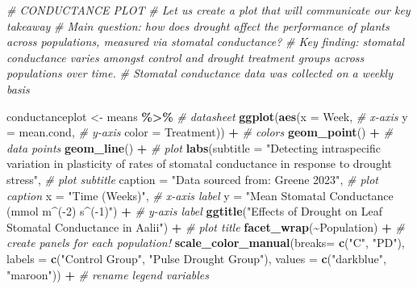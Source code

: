 \documentclass[
]{article}
\newenvironment{Shaded}{\begin{snugshade}}{\end{snugshade}}
\newcommand{\AttributeTok}[1]{\textcolor[rgb]{0.13,0.29,0.53}{#1}}
\newcommand{\CommentTok}[1]{\textcolor[rgb]{0.56,0.35,0.01}{\textit{#1}}}
\newcommand{\FunctionTok}[1]{\textcolor[rgb]{0.13,0.29,0.53}{\textbf{#1}}}
\newcommand{\NormalTok}[1]{#1}
\newcommand{\OtherTok}[1]{\textcolor[rgb]{0.56,0.35,0.01}{#1}}
\newcommand{\SpecialCharTok}[1]{\textcolor[rgb]{0.81,0.36,0.00}{\textbf{#1}}}
\newcommand{\StringTok}[1]{\textcolor[rgb]{0.31,0.60,0.02}{#1}}
\begin{document}
\begin{Shaded}
\begin{Highlighting}[]
\CommentTok{\# CONDUCTANCE PLOT}
\CommentTok{\# Let us create a plot that will communicate our key takeaway}
\CommentTok{\# Main question: how does drought affect the performance of plants across populations, measured via stomatal conductance?}
\CommentTok{\# Key finding: stomatal conductance varies amongst control and drought treatment groups across populations over time.}
\CommentTok{\# Stomatal conductance data was collected on a weekly basis}

\NormalTok{conductanceplot }\OtherTok{\textless{}{-}}\NormalTok{ means }\SpecialCharTok{\%\textgreater{}\%} \CommentTok{\# datasheet}
  \FunctionTok{ggplot}\NormalTok{(}\FunctionTok{aes}\NormalTok{(}\AttributeTok{x =}\NormalTok{ Week, }\CommentTok{\# x{-}axis}
             \AttributeTok{y =}\NormalTok{ mean.cond, }\CommentTok{\# y{-}axis}
             \AttributeTok{color =}\NormalTok{ Treatment)) }\SpecialCharTok{+} \CommentTok{\# colors}
  \FunctionTok{geom\_point}\NormalTok{() }\SpecialCharTok{+}  \CommentTok{\# data points}
  \FunctionTok{geom\_line}\NormalTok{() }\SpecialCharTok{+}  \CommentTok{\# plot}
  \FunctionTok{labs}\NormalTok{(}\AttributeTok{subtitle =} \StringTok{"Detecting intraspecific variation in plasticity of rates of stomatal conductance in response to drought stress"}\NormalTok{, }\CommentTok{\# plot subtitle}
       \AttributeTok{caption =} \StringTok{"Data sourced from: Greene 2023"}\NormalTok{, }\CommentTok{\# plot caption}
       \AttributeTok{x =} \StringTok{"Time (Weeks)"}\NormalTok{, }\CommentTok{\# x{-}axis label}
       \AttributeTok{y =} \StringTok{"Mean Stomatal Conductance (mmol m\^{}({-}2) s\^{}({-}1)"}\NormalTok{) }\SpecialCharTok{+} \CommentTok{\# y{-}axis label}
  \FunctionTok{ggtitle}\NormalTok{(}\StringTok{"Effects of Drought on Leaf Stomatal Conductance in \textquotesingle{}A\textquotesingle{}ali\textquotesingle{}i"}\NormalTok{) }\SpecialCharTok{+} \CommentTok{\# plot title}
  \FunctionTok{facet\_wrap}\NormalTok{(}\SpecialCharTok{\textasciitilde{}}\NormalTok{Population) }\SpecialCharTok{+} \CommentTok{\# create panels for each population!}
  \FunctionTok{scale\_color\_manual}\NormalTok{(}\AttributeTok{breaks=} \FunctionTok{c}\NormalTok{(}\StringTok{"C"}\NormalTok{, }\StringTok{"PD"}\NormalTok{), }\AttributeTok{labels =} \FunctionTok{c}\NormalTok{(}\StringTok{"Control Group"}\NormalTok{, }\StringTok{"Pulse Drought Group"}\NormalTok{), }\AttributeTok{values =} \FunctionTok{c}\NormalTok{(}\StringTok{"darkblue"}\NormalTok{, }\StringTok{"maroon"}\NormalTok{)) }\SpecialCharTok{+} \CommentTok{\# rename legend variables}

\end{Highlighting}
\end{Shaded}
\end{document}
